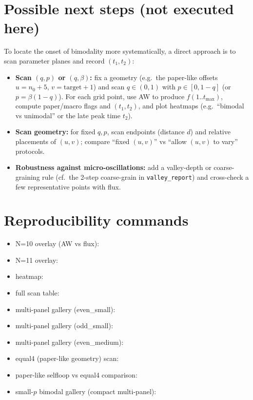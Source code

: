 \documentclass[11pt]{article}
\begin{document}
\section{Possible next steps (not executed here)}
To locate the onset of bimodality more systematically, a direct approach is to scan parameter planes and record $(t_1,t_2)$:
\begin{itemize}
  \item \textbf{Scan $(q,p)$ or $(q,\beta)$:} fix a geometry (e.g.\ the paper-like offsets $u=n_0+5$, $v=\mathrm{target}+1$) and scan
  $q\in(0,1)$ with $p\in[0,1-q]$ (or $p=\beta(1-q)$). For each grid point, use AW to produce $f(1..t_{\max})$, compute paper/macro flags and $(t_1,t_2)$, and plot heatmaps (e.g.\ “bimodal vs unimodal” or the late peak time $t_2$).
  \item \textbf{Scan geometry:} for fixed $q,p$, scan endpoints (distance $d$) and relative placements of $(u,v)$; compare “fixed $(u,v)$” vs “allow $(u,v)$ to vary” protocols.
  \item \textbf{Robustness against micro-oscillations:} add a valley-depth or coarse-graining rule (cf.\ the 2-step coarse-grain in \texttt{valley\_report}) and cross-check a few representative points with flux.
\end{itemize}

\section{Reproducibility commands}
\begin{itemize}
\item N=10 overlay (AW vs flux): 
\item N=11 overlay: 
\item heatmap: 
\item full scan table: 
\item multi-panel gallery (even\_small): 
\item multi-panel gallery (odd\_small): 
\item multi-panel gallery (even\_medium): 
\item equal4 (paper-like geometry) scan: 
\item paper-like selfloop vs equal4 comparison: 
\item small-$p$ bimodal gallery (compact multi-panel): 
\end{itemize}
\end{document}
